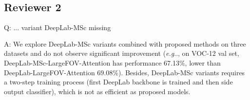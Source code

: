 \documentclass[10pt,twocolumn,letterpaper]{article}
\makeatletter
\def\@onedot{\ifx\@let@token.\else.\null\fi\xspace}
\DeclareRobustCommand\onedot{\futurelet\@let@token\@onedot}
\def\eg{\emph{e.g}\onedot} \def\Eg{\emph{E.g}\onedot}
\makeatother
\begin{document}

\vspace{-0.17cm}
\subsection{Reviewer 2}
\vspace{-0.17cm}
Q: ... variant DeepLab-MSc missing

A: We explore DeepLab-MSc variants combined with proposed methods on three datasets and do not observe significant improvement (\eg, on VOC-12 val set, DeepLab-MSc-LargeFOV-Attention has performance 67.13\%, lower than DeepLab-LargeFOV-Attention 69.08\%). Besides, DeepLab-MSc variants requires a two-step training process (first DeepLab backbone is trained and then side output classifier), which is not as efficient as proposed models.

\end{document}
